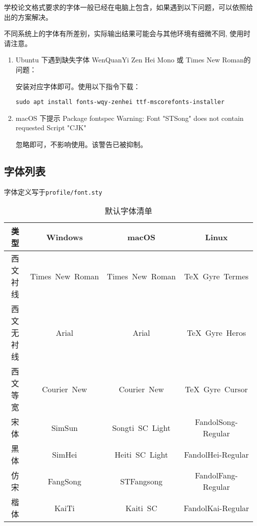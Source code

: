学校论文格式要求的字体一般已经在电脑上包含，如果遇到以下问题，可以依照给出的方案解决。

不同系统上的字体有所差别，实际输出结果可能会与其他环境有细微不同, 使用时请注意。

\begin{enumerate}
    \item Ubuntu 下遇到缺失字体 WenQuanYi Zen Hei Mono 或 Times New Roman的问题：
    
       安装对应字体即可。使用以下指令下载：
       
       \begin{lstlisting}
sudo apt install fonts-wqy-zenhei ttf-mscorefonts-installer
        \end{lstlisting}

    \item macOS 下提示 Package fontspec Warning: Font "STSong" does not contain requested Script "CJK"

       忽略即可，不影响使用。该警告已被抑制。
\end{enumerate}

\subsection{字体列表}

字体定义写于\texttt{profile/font.sty}

\begin{table}[htbp]
    \caption{默认字体清单}
    \label{tab:fontset}
    \begin{tabular}{cccc}
        \toprule
        类型 & Windows & macOS & Linux \\
        \midrule
        西文衬线 & Times~New~Roman & Times~New~Roman & TeX~Gyre~Termes \\
        西文无衬线 & Arial & Arial & TeX~Gyre~Heros \\
        西文等宽 & Courier~New & Courier~New & TeX~Gyre~Cursor \\
        宋体 & SimSun & Songti~SC~Light &FandolSong-Regular \\
        黑体 & SimHei & Heiti~SC~Light & FandolHei-Regular \\
        仿宋 & FangSong & STFangsong & FandolFang-Regular \\
        楷体 & KaiTi & Kaiti~SC & FandolKai-Regular \\
        \bottomrule
    \end{tabular}
\end{table}
